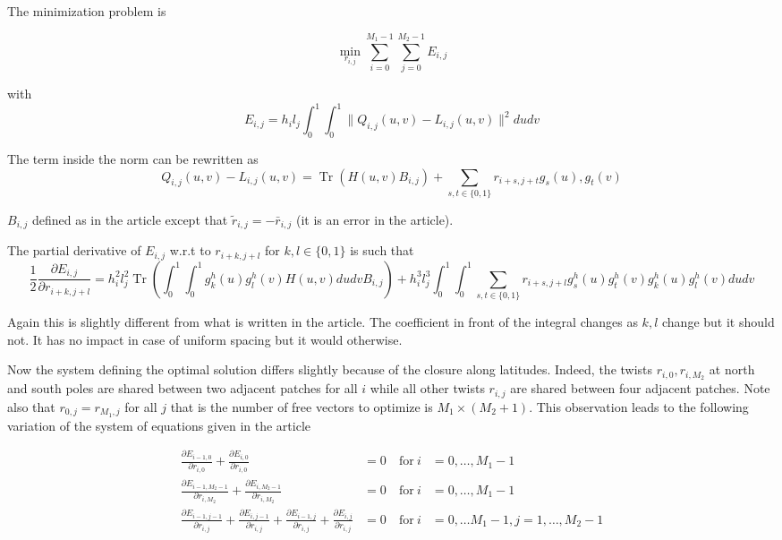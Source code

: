 \documentclass[a4paper, 11pt]{article}
\DeclareMathOperator*{\Tr}{Tr}
\begin{document}
The minimization problem is

\begin{equation*}
  \min_{r_{i,j}} \sum_{i=0}^{M_1-1} \sum_{j=0}^{M_2-1} E_{i,j}
\end{equation*}

with \begin{equation*}
  E_{i,j} = h_i l_j \int_0^1 \int_0^1 \| Q_{i,j}(u,v) - L_{i,j}(u,v) \|^2 du dv
\end{equation*}

The term inside the norm can be rewritten as
\begin{equation*}
  Q_{i,j}(u,v) - L_{i,j}(u,v) = \Tr (H(u,v)B_{i,j}) + \sum_{s,t \in \{0, 1\}} r_{i+s, j+t} g_s(u), g_t(v)
\end{equation*}

\begin{remark}{1} 
  $B_{i,j}$ defined as in the article except that $\tilde{r}_{i,j} = -\bar{r}_{i,j}$ (it is an error in the article).  
\end{remark}

The partial derivative of $E_{i,j}$ w.r.t to $r_{i+k, j+l}$ for $k, l \in \{0,1\}$ is such that
\begin{equation*}
  \frac{1}{2} \frac{\partial E_{i,j}}{\partial r_{i+k, j+l}} = h_i^2 l_j^2  \Tr \left( \int_0^1 \int_0^1 g_k^h(u) 
  g_l^h(v) H(u,v) du dv B_{i,j} \right) + h_i^3 l_j^3 \int_0^1 \int_0^1 \sum_{s,t \in \{0,1\}} r_{i+s, j+l} g_s^h(u) 
  g_t^h(v) g_k^h(u)g_l^h(v) du dv
\end{equation*}

\begin{remark}{2}
  Again this is slightly different from what is written in the article. The coefficient in front of the integral changes 
  as $k, l$ change but it should not. It has no impact in case of uniform spacing but it would otherwise.
\end{remark}

Now the system defining the optimal solution differs slightly because of the closure along latitudes. Indeed, the twists 
$r_{i,0}, r_{i, M_2}$ at north and south poles are shared between two adjacent patches for all $i$ while all other 
twists $r_{i,j}$ are shared between four adjacent patches. Note also that $r_{0,j} = r_{M_1, j}$ for all $j$ that is the 
number of free vectors to optimize is $M_1 \times (M_2+1)$. This observation leads to the following variation of the 
system of equations given in the article

\begin{align}
  \frac{\partial E_{i-1, 0}}{\partial r_{i,0}} + \frac{\partial E_{i, 0}}{\partial r_{i,0}} &= 0 & \ \text{for} \ i&=0, 
  \ldots, M_1-1 \label{eq:a} \\
  \frac{\partial E_{i-1, M_2-1}}{\partial r_{i,M_2}} + \frac{\partial E_{i, M_2-1}}{\partial r_{i,M_2}} &= 0 & \ 
  \text{for}\
  i&=0, \ldots, M_1-1 \label{eq:b} \\
  \frac{\partial E_{i-1, j-1}}{\partial r_{i,j}} + \frac{\partial E_{i, j-1}}{\partial r_{i,j}} + \frac{\partial E_{i-1, 
  j}}{\partial r_{i,j}} + \frac{\partial E_{i, j}}{\partial r_{i,j}} &= 0 & \ \text{for} \ i&=0, \ldots M_1 - 1, j=1, 
  \ldots, M_2-1 \label{eq:c}
\end{align}
\end{document}
